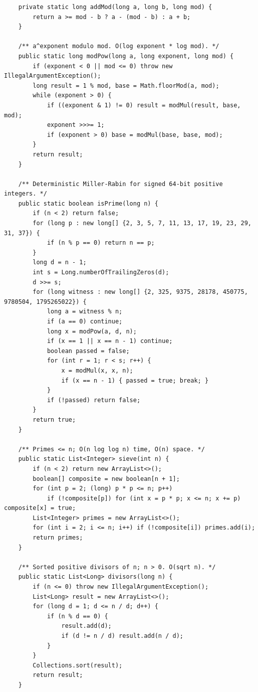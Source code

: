 \documentclass[10pt,letterpaper]{article}
\begin{document}
\begin{lstlisting}
    private static long addMod(long a, long b, long mod) {
        return a >= mod - b ? a - (mod - b) : a + b;
    }

    /** a^exponent modulo mod. O(log exponent * log mod). */
    public static long modPow(long a, long exponent, long mod) {
        if (exponent < 0 || mod <= 0) throw new IllegalArgumentException();
        long result = 1 % mod, base = Math.floorMod(a, mod);
        while (exponent > 0) {
            if ((exponent & 1) != 0) result = modMul(result, base, mod);
            exponent >>>= 1;
            if (exponent > 0) base = modMul(base, base, mod);
        }
        return result;
    }

    /** Deterministic Miller-Rabin for signed 64-bit positive integers. */
    public static boolean isPrime(long n) {
        if (n < 2) return false;
        for (long p : new long[] {2, 3, 5, 7, 11, 13, 17, 19, 23, 29, 31, 37}) {
            if (n % p == 0) return n == p;
        }
        long d = n - 1;
        int s = Long.numberOfTrailingZeros(d);
        d >>= s;
        for (long witness : new long[] {2, 325, 9375, 28178, 450775, 9780504, 1795265022}) {
            long a = witness % n;
            if (a == 0) continue;
            long x = modPow(a, d, n);
            if (x == 1 || x == n - 1) continue;
            boolean passed = false;
            for (int r = 1; r < s; r++) {
                x = modMul(x, x, n);
                if (x == n - 1) { passed = true; break; }
            }
            if (!passed) return false;
        }
        return true;
    }

    /** Primes <= n; O(n log log n) time, O(n) space. */
    public static List<Integer> sieve(int n) {
        if (n < 2) return new ArrayList<>();
        boolean[] composite = new boolean[n + 1];
        for (int p = 2; (long) p * p <= n; p++)
            if (!composite[p]) for (int x = p * p; x <= n; x += p) composite[x] = true;
        List<Integer> primes = new ArrayList<>();
        for (int i = 2; i <= n; i++) if (!composite[i]) primes.add(i);
        return primes;
    }

    /** Sorted positive divisors of n; n > 0. O(sqrt n). */
    public static List<Long> divisors(long n) {
        if (n <= 0) throw new IllegalArgumentException();
        List<Long> result = new ArrayList<>();
        for (long d = 1; d <= n / d; d++) {
            if (n % d == 0) {
                result.add(d);
                if (d != n / d) result.add(n / d);
            }
        }
        Collections.sort(result);
        return result;
    }


\end{lstlisting}
\end{document}
